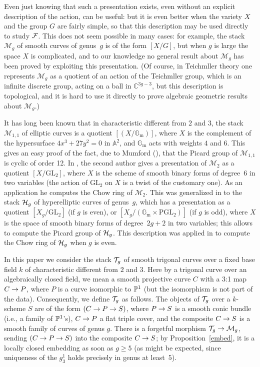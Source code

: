 \documentclass{amsart}
\numberwithin{equation}{section}
\numberwithin{subsection}{section}
\theoremstyle{definition}
\theoremstyle{remark}
\newcommand\cM{\mathcal{M}} \newcommand\cN{\mathcal{N}}
\renewcommand\AA{\mathbb{A}} \newcommand\BB{\mathbb{B}}
\newcommand\CC{\mathbb{C}} \newcommand\DD{\mathbb{D}}
\newcommand\arr{\ifinner\to\else\longrightarrow\fi}
\newcommand{\T}[1][g]{\cT_{#1}}
\newcommand{\GL}{\mathrm{GL}}
\newcommand{\PGL}{\mathrm{PGL}}
\newcommand{\gm}{\mathbb{G}_{\mathrm{m}}}
\begin{document}
Even just knowing that such a presentation exists, even without an explicit description of the action, can be useful: but it is even better when the variety $X$ and the group $G$ are fairly simple, so that this description may be used directly to study $\mathcal{F}$. This does not seem possible in many cases: for example, the stack $\cM_{g}$ of smooth curves of genus~$g$ is of the form $[X/G]$, but when $g$ is large the space $X$ is complicated, and to our knowledge no general result about $\cM_{g}$ has been proved by exploiting this presentation. (Of course, in Teichmller theory one represents $\cM_{g}$ as a quotient of an action of the Teichmller group, which is an infinite discrete group, acting on a ball in $\CC^{3g-3}$, but this description is topological, and it is hard to use it directly to prove algebraic geometric results about $\cM_{g}$.)

It has long been known that in characteristic different from $2$ and $3$, the stack $\cM_{1,1}$ of elliptic curves is a quotient $[(X/\gm)]$, where $X$ is the complement of the hypersurface $4x^{3} + 27y^{2} = 0$ in $\AA^{2}$, and $\gm$ acts with weights $4$ and $6$. This gives an easy proof of the fact, due to Mumford (\cite{mumford-picard}), that the Picard group of $\cM_{1,1}$ is cyclic of order 12. In \cite{vistoli98}, the second author gives a presentation of $\cM_{2}$ as a quotient $[X/\GL_{2}]$, where $X$ is the scheme of smooth binary forms of degree~$6$ in two variables (the action of $\GL_{2}$ on $X$ is a twist of the customary one). As an application he computes the Chow ring of $\cM_{2}$. This was generalized in \cite{visars} to the stack $\mathcal{H}_{g}$ of hyperelliptic curves of genus~$g$, which has a presentation as a quotient $[X_{g}/\GL_{2}]$ (if $g$ is even), or $[X_{g}/(\gm\times\PGL_{2})]$ (if $g$ is odd), where $X$ is the space of smooth binary forms of degree~$2g+2$ in two variables; this allows to compute the Picard group of $\mathcal{H}_{g}$. This description was applied in \cite{edidin-fulghesu-even} to compute the Chow ring of $\mathcal{H}_{g}$ when $g$ is even.

In this paper we consider the stack $\T$ of smooth trigonal curves over a fixed base field $k$ of characteristic different from $2$ and $3$. Here by a trigonal curve over an algebraically closed field, we mean a smooth projective curve $C$ with a 3:1 map $C \arr P$, where $P$ is a curve isomorphic to $\mathbb{P}^{1}$ (but the isomorphism is not part of the data). Consequently, we define $\T$ as follows. The objects of $\T$ over a $k$-scheme $S$ are of the form $(C \arr P \arr S)$, where $P \arr S$ is a smooth conic bundle (i.e., a family of $\mathbb{P}^{1}$'s), $C \arr P$ a flat triple cover, and the composite $C \arr S$ is a smooth family of curves of genus $g$. There is a forgetful morphism $\T \arr \cM_{g}$, sending $(C \arr P \arr S)$ into the composite $C \arr S$; by Proposition~\ref{embed}, it is a locally closed embedding as soon as $g \geq 5$ (as might be expected, since uniqueness of the $g^{1}_{3}$ holds precisely in genus at least~$5$).
\end{document}
